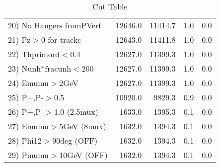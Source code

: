 \begin{table}[h!]
\begin{tabular}{||l||r|r|r|r||}
 20) No Hangers fromPVert &     12646.0 &     11414.7 &         1.0 &         0.0 \\
 21) Pz$>$0 for tracks    &     12643.0 &     11411.8 &         1.0 &         0.0 \\
 22) Thprimord$<$0.4      &     12627.0 &     11399.3 &         1.0 &         0.0 \\
 23) Nunh*fracunh$<$200   &     12627.0 &     11399.3 &         1.0 &         0.0 \\
 24) Emumu$>$2GeV         &     12627.0 &     11399.3 &         1.0 &         0.0 \\
 25) P+,P-$>$0.5          &     10920.0 &      9829.3 &         0.9 &         0.0 \\
 26) P+,P-$>$1.0 (2.5mux) &      1633.0 &      1395.3 &         0.1 &         0.0 \\
 27) Emumu$>$5GeV  (8mux) &      1632.0 &      1394.3 &         0.1 &         0.0 \\
 28) Phi12$>$90deg  (OFF) &      1632.0 &      1394.3 &         0.1 &         0.0 \\
 29) Pmumu$>$10GeV  (OFF) &      1632.0 &      1394.3 &         0.1 &         0.0 \\
 \hline
 \hline
 \end{tabular}
 \caption{Cut Table \cohjp  }
 \label{tab-cut__jpsi}
 \end{table}
